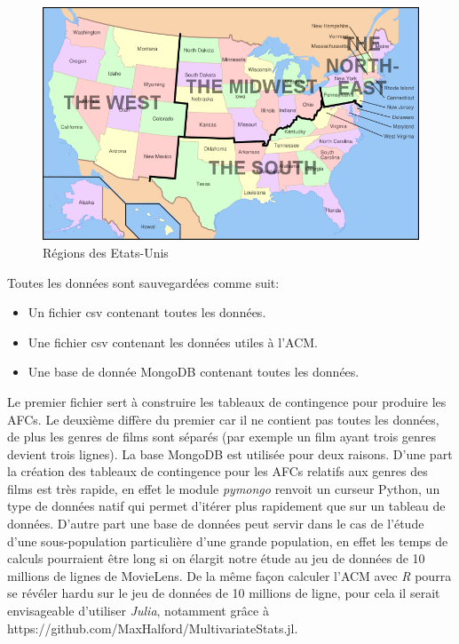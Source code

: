 \begin{figure}[htd]
\centering
\includegraphics[scale=0.5]{./images/usRegions}
\caption{Régions des Etats-Unis}
\end{figure}
Toutes les données sont sauvegardées comme suit:
\begin{itemize}
  \item Un fichier csv contenant toutes les données.
  \item Une fichier csv contenant les données utiles à l'ACM.
  \item Une base de donnée MongoDB contenant toutes les données.
\end{itemize}
Le premier fichier sert à construire les tableaux de contingence pour produire les AFCs. Le deuxième diffère du premier car il ne contient pas toutes les données, de plus les genres de films sont séparés (par exemple un film ayant trois genres devient trois lignes). La base MongoDB est utilisée pour deux raisons. D'une part la création des tableaux de contingence pour les AFCs relatifs aux genres des films est très rapide, en effet le module \emph{pymongo} renvoit un curseur Python, un type de données natif qui permet d'itérer plus rapidement que sur un tableau de données. D'autre part une base de données peut servir dans le cas de l'étude d'une sous-population particulière d'une grande population, en effet les temps de calculs pourraient être long si on élargit notre étude au jeu de données de 10 millions de lignes de MovieLens. De la même façon calculer l'ACM avec \emph{R} pourra se révéler hardu sur le jeu de données de 10 millions de ligne, pour cela il serait envisageable d'utiliser \emph{Julia}, notamment grâce à https://github.com/MaxHalford/MultivariateStats.jl. 